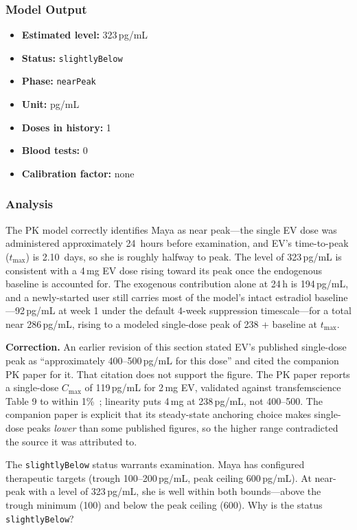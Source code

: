 \documentclass[11pt,a4paper]{article}
\newcommand{\code}[1]{\texttt{\small #1}}
\begin{document}
\subsubsection{Model Output}

\begin{itemize}[nosep,leftmargin=1.4em]
\item \textbf{Estimated level:} 323\,pg/mL
\item \textbf{Status:} \code{slightlyBelow}
\item \textbf{Phase:} \code{nearPeak}
\item \textbf{Unit:} pg/mL
\item \textbf{Doses in history:} 1
\item \textbf{Blood tests:} 0
\item \textbf{Calibration factor:} none
\end{itemize}

\subsubsection{Analysis}

The PK model correctly identifies Maya as near peak---the single EV dose was
administered approximately 24~hours before examination, and EV's
time-to-peak ($t_{\max}$) is 2.10~days, so she is roughly halfway to peak.
The level of 323\,pg/mL is consistent with a 4\,mg EV dose rising toward
its peak once the endogenous baseline is accounted for. The exogenous
contribution alone at 24\,h is 194\,pg/mL, and a newly-started user still
carries most of the model's intact estradiol baseline---92\,pg/mL at week
1 under the default 4-week suppression timescale---for a total near
286\,pg/mL, rising to a modeled single-dose peak of 238 + baseline at
$t_{\max}$.

\textbf{Correction.} An earlier revision of this section stated EV's
published single-dose peak as ``approximately 400--500\,pg/mL for this
dose'' and cited the companion PK paper for it. That citation does not
support the figure. The PK paper reports a single-dose $C_{\max}$ of
119\,pg/mL for 2\,mg EV, validated against transfemscience Table 9 to
within 1\%~\cite{xtpk}; linearity puts 4\,mg at 238\,pg/mL, not 400--500.
The companion paper is explicit that its steady-state anchoring choice
makes single-dose peaks \emph{lower} than some published figures, so the
higher range contradicted the source it was attributed to.

The \code{slightlyBelow} status warrants examination. Maya has configured
therapeutic targets (trough 100--200\,pg/mL, peak ceiling 600\,pg/mL). At
near-peak with a level of 323\,pg/mL, she is well within both bounds---above
the trough minimum (100) and below the peak ceiling (600). Why is the status
\code{slightlyBelow}?
\end{document}

